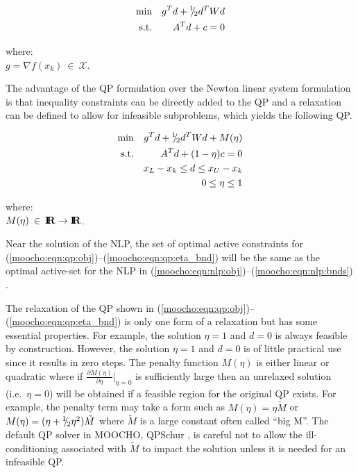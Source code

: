 \documentclass[pdf,12pt,report]{SANDreport}
\begin{document}
{\bsinglespace
\begin{eqnarray}
\mbox{min}  &  & g^T d + {}^1 \!\! / \! {}_2 d^T W d   \label{moocho:eqn:qp_newton:obj} \\
\mbox{s.t.} &  & A^T d + c = 0                \label{moocho:eqn:qp_newton:equ}
\end{eqnarray}
\begin{tabbing}
\hspace{4ex}where:\hspace{5ex}\= \\
\>	$g = \nabla f(x_k) \:\in\:\mathcal{X}.$
\end{tabbing}
\esinglespace}

The advantage of the QP formulation over the Newton linear system formulation
is that inequality constraints can be directly added to the QP and a
relaxation can be defined to allow for infeasible subproblems, which yields
the following QP.

{\bsinglespace
\begin{eqnarray}
\mbox{min}  &  & g^T d + {}^1 \!\! / \! {}_2 d^T W d + M(\eta)                   \label{moocho:eqn:qp:obj} \\
\mbox{s.t.} &  & A^T d + (1-\eta) c = 0                                 \label{moocho:eqn:qp:equ} \\
            &  & x_L - x_k \leq d \leq x_U -x_k                         \label{moocho:eqn:qp:bnds} \\
            &  & 0 \leq \eta \leq 1                                     \label{moocho:eqn:qp:eta_bnd}
\end{eqnarray}
\begin{tabbing}
\hspace{4ex}where:\hspace{5ex}\= \\
\>	$M(\eta) \:\in\:\mbox{\textbf{I}}\hspace{-0.6ex}\mbox{\textbf{R}} \rightarrow \mbox{\textbf{I}}\hspace{-0.6ex}\mbox{\textbf{R}}$.
\end{tabbing}
\esinglespace}

Near the solution of the NLP, the set of optimal active constraints for
(\ref{moocho:eqn:qp:obj})--(\ref{moocho:eqn:qp:eta_bnd}) will be the same as
the optimal active-set for the NLP in
(\ref{moocho:eqn:nlp:obj})--(\ref{moocho:eqn:nlp:bnds}) {}\cite[Theorem
18.1]{JNocedal_SJWright_1999}.

The relaxation of the QP shown in
(\ref{moocho:eqn:qp:obj})--(\ref{moocho:eqn:qp:eta_bnd}) is only one form of a
relaxation but has some essential properties.  For example, the solution $\eta
= 1$ and $d = 0$ is always feasible by construction.  However, the solution
$\eta = 1$ and $d = 0$ is of little practical use since it results in zero
steps.  The penalty function $M(\eta)$ is either linear or quadratic where if
$\frac{\partial M(\eta)}{\partial {}\eta}|_{\eta = 0}$ is sufficiently large
then an unrelaxed solution (i.e.\ $\eta = 0$) will be obtained if a feasible
region for the original QP exists.  For example, the penalty term may take a
form such as $M(\eta) = {}\eta \tilde{M}$ or $M(\eta) = (\eta + {}{}^1 \!\! / \! {}_2
{}\eta^2)\tilde{M}$ where $\tilde{M}$ is a large constant often called ``big
M''.  The default QP solver in MOOCHO, QPSchur {}\cite{bartlett-qpschur}, is
careful not to allow the ill-conditioning associated with $\tilde{M}$ to
impact the solution unless it is needed for an infeasible QP.
\end{document}
